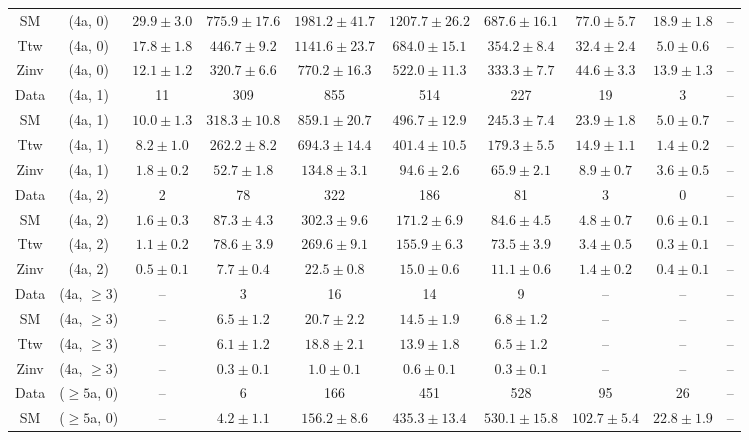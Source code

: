\begin{table}[h!]
{\begin{tabular}{cccccccccc}
	SM & (4a, 0) & $29.9\pm 3.0$ & $775.9\pm 17.6$ & $1981.2\pm 41.7$ & $1207.7\pm 26.2$ & $687.6\pm 16.1$ & $77.0\pm 5.7$ & $18.9\pm 1.8$ & -- \\[0.5ex] 
	Ttw & (4a, 0) & $17.8\pm 1.8$ & $446.7\pm 9.2$ & $1141.6\pm 23.7$ & $684.0\pm 15.1$ & $354.2\pm 8.4$ & $32.4\pm 2.4$ & $5.0\pm 0.6$ & -- \\[0.5ex] 
	Zinv & (4a, 0) & $12.1\pm 1.2$ & $320.7\pm 6.6$ & $770.2\pm 16.3$ & $522.0\pm 11.3$ & $333.3\pm 7.7$ & $44.6\pm 3.3$ & $13.9\pm 1.3$ & -- \\[0.5ex] 
	Data & (4a, 1) & 11 & 309 & 855 & 514 & 227 & 19 & 3 & -- \\[0.5ex] 
	SM & (4a, 1) & $10.0\pm 1.3$ & $318.3\pm 10.8$ & $859.1\pm 20.7$ & $496.7\pm 12.9$ & $245.3\pm 7.4$ & $23.9\pm 1.8$ & $5.0\pm 0.7$ & -- \\[0.5ex] 
	Ttw & (4a, 1) & $8.2\pm 1.0$ & $262.2\pm 8.2$ & $694.3\pm 14.4$ & $401.4\pm 10.5$ & $179.3\pm 5.5$ & $14.9\pm 1.1$ & $1.4\pm 0.2$ & -- \\[0.5ex] 
	Zinv & (4a, 1) & $1.8\pm 0.2$ & $52.7\pm 1.8$ & $134.8\pm 3.1$ & $94.6\pm 2.6$ & $65.9\pm 2.1$ & $8.9\pm 0.7$ & $3.6\pm 0.5$ & -- \\[0.5ex] 
	Data & (4a, 2) & 2 & 78 & 322 & 186 & 81 & 3 & 0 & -- \\[0.5ex] 
	SM & (4a, 2) & $1.6\pm 0.3$ & $87.3\pm 4.3$ & $302.3\pm 9.6$ & $171.2\pm 6.9$ & $84.6\pm 4.5$ & $4.8\pm 0.7$ & $0.6\pm 0.1$ & -- \\[0.5ex] 
	Ttw & (4a, 2) & $1.1\pm 0.2$ & $78.6\pm 3.9$ & $269.6\pm 9.1$ & $155.9\pm 6.3$ & $73.5\pm 3.9$ & $3.4\pm 0.5$ & $0.3\pm 0.1$ & -- \\[0.5ex] 
	Zinv & (4a, 2) & $0.5\pm 0.1$ & $7.7\pm 0.4$ & $22.5\pm 0.8$ & $15.0\pm 0.6$ & $11.1\pm 0.6$ & $1.4\pm 0.2$ & $0.4\pm 0.1$ & -- \\[0.5ex] 
	Data & (4a, $\ge3$) & -- & 3 & 16 & 14 & 9 & -- & -- & -- \\[0.5ex] 
	SM & (4a, $\ge3$) & -- & $6.5\pm 1.2$ & $20.7\pm 2.2$ & $14.5\pm 1.9$ & $6.8\pm 1.2$ & -- & -- & -- \\[0.5ex] 
	Ttw & (4a, $\ge3$) & -- & $6.1\pm 1.2$ & $18.8\pm 2.1$ & $13.9\pm 1.8$ & $6.5\pm 1.2$ & -- & -- & -- \\[0.5ex] 
	Zinv & (4a, $\ge3$) & -- & $0.3\pm 0.1$ & $1.0\pm 0.1$ & $0.6\pm 0.1$ & $0.3\pm 0.1$ & -- & -- & -- \\[0.5ex] 
	Data & ($\ge5$a, 0) & -- & 6 & 166 & 451 & 528 & 95 & 26 & -- \\[0.5ex] 
	SM & ($\ge5$a, 0) & -- & $4.2\pm 1.1$ & $156.2\pm 8.6$ & $435.3\pm 13.4$ & $530.1\pm 15.8$ & $102.7\pm 5.4$ & $22.8\pm 1.9$ & -- \\[0.5ex] 

\end{tabular}}
\end{table}
